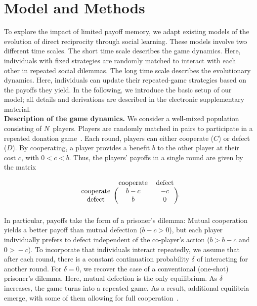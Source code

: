 \documentclass[11pt]{article}
\def\esm{electronic supplementary material}
\theoremstyle{plainCl1}
\theoremstyle{plainCl2}
\begin{document}
\section{Model and Methods}\label{section:model}


To explore the impact of limited payoff memory, we adapt existing models of the evolution of direct reciprocity through social learning. 
These models involve two different time scales. 
The short time scale describes the game dynamics. 
Here, individuals with fixed strategies are randomly matched to interact with each other in repeated social dilemmas. 
The long time scale describes the evolutionary dynamics. 
Here, individuals can update their repeated-game strategies based on the payoffs they yield. 
In the following, we introduce the basic setup of our model; all details and derivations are described in the \esm.\\


\noindent
{\bf Description of the game dynamics.} We consider a well-mixed population consisting of $N$~players.
Players are randomly matched in pairs to participate in a repeated donation game~\citep{sigmund2010calculus}.
Each round, players can either cooperate (\(C\)) or defect (\(D\)). 
By cooperating, a player provides a benefit \(b\) to the other player at their cost \(c\), with \(0 \!<\! c \!<\! b\). 
Thus, the players' payoffs in a single round are given by the matrix

\begin{equation}
    \begin{blockarray}{ccc}
        & \text{cooperate} & \text{defect} \\
        \begin{block}{c(cc)}
            \text{cooperate} & b - c & -c \\
            \text{defect} & b & 0 \\
        \end{block}
    \end{blockarray}.
\end{equation}
In particular, payoffs take the form of a prisoner's dilemma:
Mutual cooperation yields a better payoff than mutual defection ($b\!-\!c\!>\!0$), but each player individually prefers to defect independent of the co-player's action ($b\!>\!b\!-\!c$ and $0\!>\!-c$). 
To incorporate that individuals interact repeatedly, we assume that after each round, there is a constant continuation probability $\delta$ of interacting for another round. 
For $\delta\!=\!0$, we recover the case of a conventional (one-shot) prisoner's dilemma. 
Here, mutual defection is the only equilibrium. 
As $\delta$ increases, the game turns into a repeated game. As a result, additional equilibria emerge, with some of them allowing for full cooperation~\citep{friedman:RES:1971,Akin:chapter:2016,hilbe:GEB:2015,stewart:pnas:2014}. 
\end{document}
